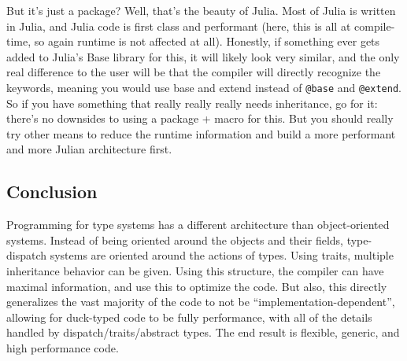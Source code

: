 \documentclass[11pt]{article}
\begin{document}
    But it's just a package? Well, that's the beauty of Julia. Most of Julia
is written in Julia, and Julia code is first class and performant (here,
this is all at compile-time, so again runtime is not affected at all).
Honestly, if something ever gets added to Julia's Base library for this,
it will likely look very similar, and the only real difference to the
user will be that the compiler will directly recognize the keywords,
meaning you would use base and extend instead of \texttt{@base} and
\texttt{@extend}. So if you have something that really really really
needs inheritance, go for it: there's no downsides to using a package +
macro for this. But you should really try other means to reduce the
runtime information and build a more performant and more Julian
architecture first.

    \hypertarget{conclusion}{%
\subsection{Conclusion}\label{conclusion}}

Programming for type systems has a different architecture than
object-oriented systems. Instead of being oriented around the objects
and their fields, type-dispatch systems are oriented around the actions
of types. Using traits, multiple inheritance behavior can be given.
Using this structure, the compiler can have maximal information, and use
this to optimize the code. But also, this directly generalizes the vast
majority of the code to not be ``implementation-dependent'', allowing
for duck-typed code to be fully performance, with all of the details
handled by dispatch/traits/abstract types. The end result is flexible,
generic, and high performance code.


    
    
    
    
\end{document}
